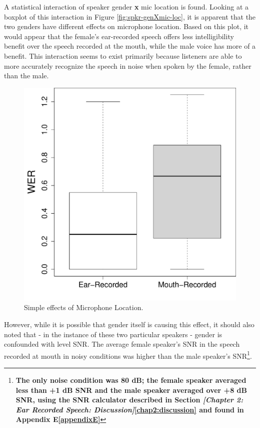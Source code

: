 \documentclass[dissertation,copyright]{uathesis}
\makeatletter
\def\maxwidth{ %
  \ifdim\Gin@nat@width>\linewidth
    \linewidth
  \else
    \Gin@nat@width
  \fi
}
\makeatother
\begin{document}
A statistical interaction of speaker gender \textbf{x} mic location is found.  
Looking at a boxplot of this interaction in Figure \ref{fig:spkr-genXmic-loc}, it is apparent that the two genders have different effects on microphone location.  Based on this plot, it would appear that the female's ear-recorded speech offers less intelligibility benefit over the speech recorded at the mouth, while the male voice has more of a benefit.  This interaction seems to exist primarily because listeners are able to more accurately recognize the speech in noise when spoken by the female, rather than the male.
%
\begin{figure}

\includegraphics[width=\maxwidth]{figure/Mic-location_simple-1} 

\caption{Simple effects of Microphone Location.}
\label{fig:mic_loc_simple}
\end{figure}
%
However, while it is possible that gender itself is causing this effect, it should also noted that - in the instance of these two particular speakers - gender is confounded with level SNR.  The average female speaker's SNR in the speech recorded at mouth in noisy conditions was higher than the male speaker's SNR\footnote{\textbf{The only noise condition was 80 dB; the female speaker averaged less than +1 dB SNR and the male speaker averaged over +8 dB SNR, using the SNR calculator described in Section \textit{[Chapter 2: Ear Recorded Speech: Discussion]}\ref{chap2:discussion} and found in Appendix E\ref{appendixE}}}.
\end{document}
